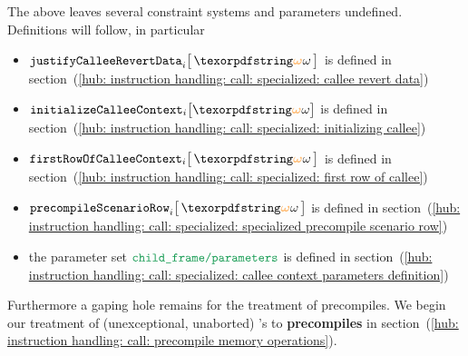 The above leaves several constraint systems and parameters undefined. Definitions will follow, in particular
\begin{itemize}
	\item $\justifyCalleeRevertData       {i}{\relof}$               is defined in section~(\ref{hub: instruction handling: call: specialized: callee revert data})
	\item $\initializeCalleeContextName  _{i} \big[ \relof \big]$    is defined in section~(\ref{hub: instruction handling: call: specialized: initializing callee})
	\item $\firstRowOfCallee              {i}{\relof}$               is defined in section~(\ref{hub: instruction handling: call: specialized: first row of callee})
	\item $\precompileScenarioRow         {i}{\relof}$               is defined in section~(\ref{hub: instruction handling: call: specialized: specialized precompile scenario row})
	\item the parameter set $\childFrameInitializationParameters$ is defined in section~(\ref{hub: instruction handling: call: specialized: callee context parameters definition})
\end{itemize}
Furthermore a gaping hole remains for the treatment of precompiles.
We begin our treatment of (unexceptional, unaborted) 's to \textbf{precompiles} in section~(\ref{hub: instruction handling: call: precompile memory operations}).
